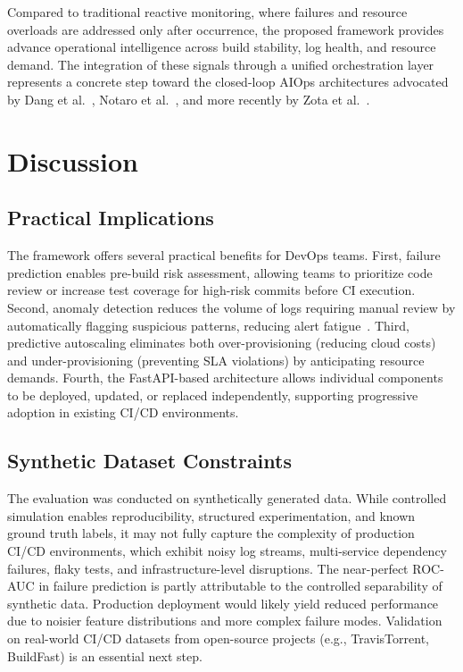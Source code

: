 \documentclass[sn-nature]{sn-jnl}
\theoremstyle{thmstyleone}
\theoremstyle{thmstyletwo}
\theoremstyle{thmstylethree}
\begin{document}
Compared to traditional reactive monitoring, where failures and resource overloads are addressed only after occurrence, the proposed framework provides advance operational intelligence across build stability, log health, and resource demand. The integration of these signals through a unified orchestration layer represents a concrete step toward the closed-loop AIOps architectures advocated by Dang et al.~\cite{dang2019aiops}, Notaro et al.~\cite{notaro2021aiops}, and more recently by Zota et al.~\cite{zota2025agentic}.

\section{Discussion}\label{sec:discussion}

\subsection{Practical Implications}\label{subsec:practical}

The framework offers several practical benefits for DevOps teams. First, failure prediction enables pre-build risk assessment, allowing teams to prioritize code review or increase test coverage for high-risk commits before CI execution. Second, anomaly detection reduces the volume of logs requiring manual review by automatically flagging suspicious patterns, reducing alert fatigue~\cite{dang2019aiops}. Third, predictive autoscaling eliminates both over-provisioning (reducing cloud costs) and under-provisioning (preventing SLA violations) by anticipating resource demands. Fourth, the FastAPI-based architecture allows individual components to be deployed, updated, or replaced independently, supporting progressive adoption in existing CI/CD environments.

\subsection{Synthetic Dataset Constraints}\label{subsec:synthetic}

The evaluation was conducted on synthetically generated data. While controlled simulation enables reproducibility, structured experimentation, and known ground truth labels, it may not fully capture the complexity of production CI/CD environments, which exhibit noisy log streams, multi-service dependency failures, flaky tests, and infrastructure-level disruptions. The near-perfect ROC-AUC in failure prediction is partly attributable to the controlled separability of synthetic data. Production deployment would likely yield reduced performance due to noisier feature distributions and more complex failure modes. Validation on real-world CI/CD datasets from open-source projects (e.g., TravisTorrent, BuildFast) is an essential next step.
\end{document}
